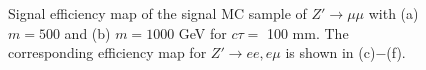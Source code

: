 \begin{figure}[!htb]
    \caption{Signal efficiency map of the signal MC sample of $Z' \rightarrow \mu\mu$ with (a) $m=500$ and (b) $m=1000$ GeV for $c\tau=$ 100 mm. The corresponding efficiency map for $Z' \rightarrow ee, e\mu$ is shown in (c)$-$(f).}
    \label{fig:signal_eff_map}
\end{figure}







